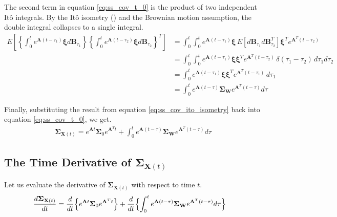 \documentclass{article}
\begin{document}
The second term in equation \ref{eq:ss_cov_t_0} is the product of two independent It\^{o} integrals. By the It\^{o} isometry (\citealp[\S3.2]{Pavliotis2014}) and the Brownian motion assumption, the double integral collapses to a single integral.
\begin{equation}
\begin{aligned}
 E \left [ \left \{ \int_0^{t} e^{\mathbf{A}(t-\tau_1)} \boldsymbol{\xi} d\mathbf{B}_{\tau_1} \right \}  \left \{ \int_0^{t} e^{\mathbf{A}(t-\tau_2)} \boldsymbol{\xi} d\mathbf{B}_{\tau_2} \right \}^T \right ]
&=\int_0^t \int_0^t e^{\mathbf{A}(t-\tau_1)} \boldsymbol{\xi} \, E\left[ d\mathbf{B}_{\tau_1} d\mathbf{B}^T_{\tau_2} \right] \boldsymbol{\xi}^T e^{\mathbf{A}^T(t-\tau_2)} \\
&=\int_0^t \int_0^t e^{\mathbf{A}(t-\tau_1)} \boldsymbol{\xi} \boldsymbol{\xi}^T e^{\mathbf{A}^T(t-\tau_2)} \, \delta(\tau_1-\tau_2) \, d\tau_1 d\tau_2 \\
&=\int_0^t  e^{\mathbf{A}(t-\tau_1)} \boldsymbol{\xi} \boldsymbol{\xi}^T e^{\mathbf{A}^T(t-\tau_1)} \, d\tau_1 \\
&=\int_0^t  e^{\mathbf{A}(t-\tau)} \mathbf{\Sigma}_\mathbf{W} e^{\mathbf{A}^T(t-\tau)} d\tau
\end{aligned}
\label{eq:ss_cov_ito_isometry}
\end{equation}

Finally, substituting the result from equation \ref{eq:ss_cov_ito_isometry} back into equation \ref{eq:ss_cov_t_0}, we get.
\begin{equation}
\begin{aligned}
\mathbf{\Sigma}_{\mathbf{X}(t)} =e^{\mathbf{A}t} \mathbf{\Sigma}_0 e^{\mathbf{A}^Tt}+ \int_0^t e^{\mathbf{A}(t-\tau)}  \mathbf{\Sigma}_\mathbf{W}  e^{\mathbf{A}^T(t-\tau)} d\tau
\end{aligned}
\end{equation}

\subsection*{The Time Derivative of $\mathbf{\Sigma}_{\mathbf{X}(t)}$}
Let us evaluate the derivative of $\mathbf{\Sigma}_{\mathbf{X}(t)}$ with respect to time $t$.
\begin{equation}
\begin{aligned}
\frac{d \mathbf{\Sigma}_{\mathbf{X}(t)}}{dt}
& =\frac{d}{dt} \Bigl \{ e^{\mathbf{A}t} \mathbf{\Sigma}_0 e^{\mathbf{A}^Tt} \Bigr \}
+ \frac{d}{dt} \Bigl \{ \int_0^t e^{\mathbf{A}(t-\tau)}  \mathbf{\Sigma}_\mathbf{W}  e^{\mathbf{A}^T(t-\tau)} d\tau \Bigr \}
\end{aligned}
\label{eq:sigma_t_deriv}
\end{equation}
\end{document}
